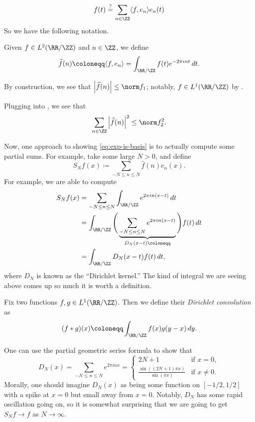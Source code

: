 \documentclass[../notes.tex]{subfiles}
\begin{document}
\begin{equation}
	f(t)\stackrel?=\sum_{n\in\ZZ}\langle f,e_n\rangle e_n(t) \label{eq:exp-is-basis}
\end{equation}
So we have the following notation.
\begin{notation}
	Given $f\in L^2(\RR/\ZZ)$ and $n\in\ZZ$, we define
	\[\widehat f(n)\coloneqq\langle f,e_n\rangle=\int_{\RR/\ZZ}f(t)e^{-2\pi int}\,dt.\]
\end{notation}
\begin{remark}
	By construction, we see that $\left|\widehat f(n)\right|\le\norm f_1$; notably, $f\in L^1(\RR/\ZZ)$ by .
\end{remark}
\begin{remark}
	Plugging  into , we see that
	\[\sum_{n\in\ZZ}\left|\widehat f(n)\right|^2\le\norm f_2^2.\]
\end{remark}
Now, one approach to showing \eqref{eq:exp-is-basis} is to actually compute some partial sums. For example, take some large $N>0$, and define
\[S_Nf(x)\coloneqq\sum_{-N\le n\le N}\widehat f(n)e_n(x).\]
For example, we are able to compute
\begin{align*}
	S_Nf(x) &= \sum_{-N\le n\le N}\int_{\RR/\ZZ}e^{2\pi in(x-t)}\,dt \\
	&= \int_{\RR/\ZZ}\Bigg(\underbrace{\sum_{-N\le n\le N}e^{2\pi in(x-t)}}_{D_N(x-t)\coloneqq}\Bigg)f(t)\,dt \\
	&= \int_{\RR/\ZZ}D_N(x-t)f(t)\,dt,
\end{align*}
where $D_N$ is known as the ``Dirichlet kernel.'' The kind of integral we are seeing above comes up so much it is worth a definition.
\begin{definition}[convolution]
	Fix two functions $f,g\in L^1(\RR/\ZZ)$. Then we define their \textit{Dirichlet convolution} as
	\[(f*g)(x)\coloneqq\int_{\RR/\ZZ}f(x)g(y-x)\,dy.\]
\end{definition}
One can use the partial geometric series formula to show that
\[D_N(x)=\sum_{-N\le n\le N}e^{2\pi inx}=\begin{cases}
	2N+1 & \text{if }x=0, \\
	\frac{\sin((2N+1)\pi x)}{\sin(\pi x)} & \text{if }x\ne0.
\end{cases}\]
Morally, one should imagine $D_N(x)$ as being some function  on $[-1/2,1/2]$ with a spike at $x=0$ but small away from $x=0$. Notably, $D_N$ has some rapid oscillation going on, so it is somewhat surprising that we are going to get $S_Nf\to f$ as $N\to\infty$.
\end{document}
